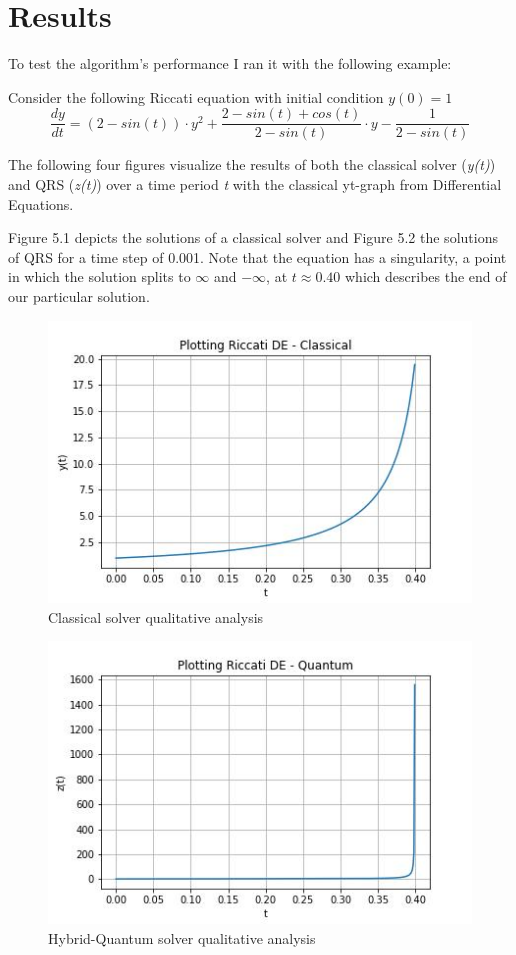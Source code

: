 \chapter{Results}
To test the algorithm's performance I ran it with the following example:

Consider the following Riccati equation with initial condition $y(0) = 1$
\begin{equation*}
    \frac{dy}{dt} = (2 - sin(t)) \cdot y^2 + \frac{2 - sin(t) + cos(t)}{2 - sin(t)} \cdot y - \frac{1}{2 - sin(t)}
\end{equation*}

The following four figures visualize the results of both the classical solver (\textit{y(t)}) and QRS (\textit{z(t)}) over a time period \textit{t} with the classical yt-graph from Differential Equations.

Figure 5.1 depicts the solutions of a classical solver and Figure 5.2 the solutions of QRS for a time step of 0.001. Note that the equation has a singularity, a point in which the solution splits to $\infty$ and $-\infty$, at $t \approx 0.40$ which describes the end of our particular solution. 

\begin{figure}[b]
    \centering
    \includegraphics[scale=0.75]{images/Classical_R2.jpg}
    \caption{Classical solver qualitative analysis}
    \label{fig:my_label}
\end{figure}
\begin{figure}[b]
    \centering
    \includegraphics[scale=0.75]{images/Quantum_R2.jpg}
    \caption{Hybrid-Quantum solver qualitative analysis}
    \label{fig:my_label}
\end{figure}

